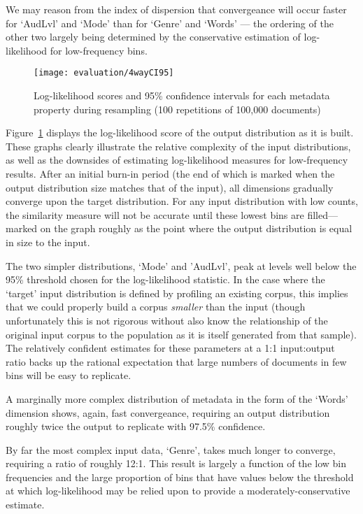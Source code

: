 We may reason from the index of dispersion that convergeance will occur faster for `AudLvl' and `Mode' than for `Genre' and `Words' --- the ordering of the other two largely being determined by the conservative estimation of log-likelihood for low-frequency bins.


\begin{figure}[Ht]
    \centering
    \texttt{[image: evaluation/4wayCI95]}
    \caption{Log-likelihood scores and 95\% confidence intervals for each metadata property during resampling (100 repetitions of 100,000 documents)}
    \label{fig:evaluation:resampling:4wayCI95}
\end{figure}


Figure~\ref{fig:evaluation:resampling:4wayCI95} displays the log-likelihood score of the output distribution as it is built.  These graphs clearly illustrate the relative complexity of the input distributions, as well as the downsides of estimating log-likelihood measures for low-frequency results.  After an initial burn-in period (the end of which is marked when the output distribution size matches that of the input), all dimensions gradually converge upon the target distribution.  For any input distribution with low counts, the similarity measure will not be accurate until these lowest bins are filled---marked on the graph roughly as the point where the output distribution is equal in size to the input.%

The two simpler distributions, `Mode' and 'AudLvl', peak at levels well below the 95\% threshold chosen for the log-likelihood statistic.  In the case where the `target' input distribution is defined by profiling an existing corpus, this implies that we could properly build a corpus \textit{smaller} than the input (though unfortunately this is not rigorous without also know the relationship of the original input corpus to the population as it is itself generated from that sample).  The relatively confident estimates for these parameters at a 1:1 input:output ratio backs up the rational expectation that large numbers of documents in few bins will be easy to replicate.

A marginally more complex distribution of metadata in the form of the `Words' dimension shows, again, fast convergeance, requiring an output distribution roughly twice the output to replicate with 97.5\% confidence.

By far the most complex input data, `Genre', takes much longer to converge, requiring a ratio of roughly 12:1.  This result is largely a function of the low bin frequencies and the large proportion of bins that have values below the threshold at which log-likelihood may be relied upon to provide a moderately-conservative estimate.


